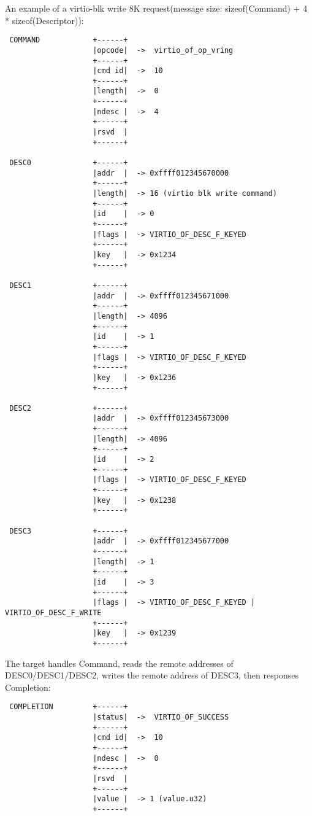 An example of a virtio-blk write 8K request(message size: sizeof(Command) + 4 * sizeof(Descriptor)):
\begin{lstlisting}
 COMMAND            +------+
                    |opcode|  ->  virtio_of_op_vring
                    +------+
                    |cmd id|  ->  10
                    +------+
                    |length|  ->  0
                    +------+
                    |ndesc |  ->  4
                    +------+
                    |rsvd  |
                    +------+

 DESC0              +------+
                    |addr  |  -> 0xffff012345670000
                    +------+
                    |length|  -> 16 (virtio blk write command)
                    +------+
                    |id    |  -> 0
                    +------+
                    |flags |  -> VIRTIO_OF_DESC_F_KEYED
                    +------+
                    |key   |  -> 0x1234
                    +------+

 DESC1              +------+
                    |addr  |  -> 0xffff012345671000
                    +------+
                    |length|  -> 4096
                    +------+
                    |id    |  -> 1
                    +------+
                    |flags |  -> VIRTIO_OF_DESC_F_KEYED
                    +------+
                    |key   |  -> 0x1236
                    +------+

 DESC2              +------+
                    |addr  |  -> 0xffff012345673000
                    +------+
                    |length|  -> 4096
                    +------+
                    |id    |  -> 2
                    +------+
                    |flags |  -> VIRTIO_OF_DESC_F_KEYED
                    +------+
                    |key   |  -> 0x1238
                    +------+

 DESC3              +------+
                    |addr  |  -> 0xffff012345677000
                    +------+
                    |length|  -> 1
                    +------+
                    |id    |  -> 3
                    +------+
                    |flags |  -> VIRTIO_OF_DESC_F_KEYED | VIRTIO_OF_DESC_F_WRITE
                    +------+
                    |key   |  -> 0x1239
                    +------+
\end{lstlisting}

The target handles Command, reads the remote addresses of DESC0/DESC1/DESC2, writes the remote address of DESC3, then responses Completion:
\begin{lstlisting}
 COMPLETION         +------+
                    |status|  ->  VIRTIO_OF_SUCCESS
                    +------+
                    |cmd id|  ->  10
                    +------+
                    |ndesc |  ->  0
                    +------+
                    |rsvd  |
                    +------+
                    |value |  -> 1 (value.u32)
                    +------+
\end{lstlisting}

